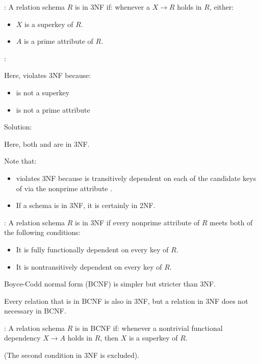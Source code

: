     \par {}: A relation schema $R$ is in 3NF if: whenever a  $X \to R$ holds in $R$, either:
    \begin{itemize}
      \item $X$ is a superkey of $R$.
      \item $A$ is a prime attribute of $R$.
    \end{itemize}
    \par {}:
    \par Here,  violates 3NF because:
    \begin{itemize}
      \item {} is not a superkey
      \item {} is not a prime attribute
    \end{itemize}
    \par Solution:
    \par Here, both  and  are in 3NF.
    \par Note that:
    \begin{itemize}
      \item {} violates 3NF because  is transitively dependent on each of the candidate keys of  via the nonprime attribute .
      \item If a schema is in 3NF, it is certainly in 2NF.
    \end{itemize}

    \par {}: A relation schema $R$ is in 3NF if every nonprime attribute of $R$ meets both of the following conditions:
    \begin{itemize}
      \item It is fully functionally dependent on every key of $R$.
      \item It is nontransitively dependent on every key of $R$.
    \end{itemize}

    \par Boyce-Codd normal form (BCNF) is simpler but stricter than 3NF.
    \par Every relation that is in BCNF is also in 3NF, but a relation in 3NF does not necessary in BCNF.
    \par {}: A relation schema $R$ is in BCNF if: whenever a nontrivial functional dependency $X \to A$ holds in $R$, then $X$ is a superkey of $R$.
    \par (The second condition in 3NF is excluded).
